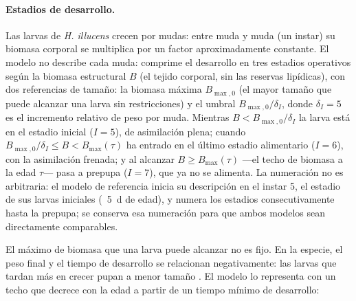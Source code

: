 \paragraph{Estadios de desarrollo.}
Las larvas de \textit{H. illucens} crecen por mudas: entre muda y muda (un instar) su biomasa corporal se multiplica por un factor aproximadamente constante. El modelo no describe cada muda: comprime el desarrollo en tres estadios operativos según la biomasa estructural $B$ (el tejido corporal, sin las reservas lipídicas), con dos referencias de tamaño: la biomasa máxima $B_{\max,0}$ (el mayor tamaño que puede alcanzar una larva sin restricciones) y el umbral $B_{\max,0}/\delta_I$, donde $\delta_I = 5$ es el incremento relativo de peso por muda. Mientras $B < B_{\max,0}/\delta_I$ la larva está en el estadio inicial ($I = 5$), de asimilación plena; cuando $B_{\max,0}/\delta_I \leq B < B_{\max}(\tau)$ ha entrado en el último estadio alimentario ($I = 6$), con la asimilación frenada; y al alcanzar $B \geq B_{\max}(\tau)$ ---el techo de biomasa a la edad $\tau$--- pasa a prepupa ($I = 7$), que ya no se alimenta. La numeración no es arbitraria: el modelo de referencia inicia su descripción en el instar 5, el estadio de sus larvas iniciales (~5~d de edad), y numera los estadios consecutivamente hasta la prepupa; se conserva esa numeración para que ambos modelos sean directamente comparables.

El máximo de biomasa que una larva puede alcanzar no es fijo. En la especie, el peso final y el tiempo de desarrollo se relacionan negativamente: las larvas que tardan más en crecer pupan a menor tamaño \parencite{eriksenDynamicModellingFeed2022}. El modelo lo representa con un techo que decrece con la edad a partir de un tiempo mínimo de desarrollo:

